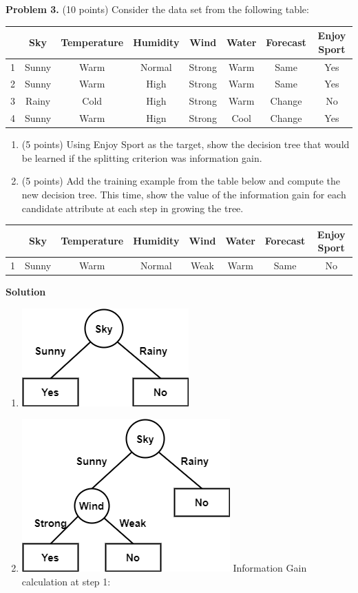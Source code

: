 \documentclass[twoside]{article}
\begin{document}

\textbf{Problem 3.} (10 points) Consider the data set from the following table:

\begin{tabular}{|c|c|c|c|c|c|c|c|}
\hline 
 & Sky & Temperature & Humidity & Wind & Water & Forecast & Enjoy Sport\tabularnewline
\hline 
\hline 
1 & Sunny & Warm & Normal & Strong & Warm & Same & Yes\tabularnewline
\hline 
2 & Sunny & Warm & High & Strong & Warm & Same & Yes\tabularnewline
\hline 
3 & Rainy & Cold & High & Strong & Warm & Change & No\tabularnewline
\hline 
4 & Sunny & Warm & Hign & Strong & Cool & Change & Yes\tabularnewline
\hline 
\end{tabular}

\begin{enumerate}
\item (5 points) Using Enjoy Sport as the target, show the decision tree that would be learned if the splitting criterion was information gain.
\item (5 points) Add the training example from the table below and compute the new decision tree. This time, show the value of the information gain for each candidate attribute at each step in growing the tree.
\end{enumerate}

\begin{tabular}{|c|c|c|c|c|c|c|c|}
\hline 
 & Sky & Temperature & Humidity & Wind & Water & Forecast & Enjoy Sport\tabularnewline
\hline 
\hline 
1 & Sunny & Warm & Normal & Weak & Warm & Same & No\tabularnewline
\hline 
\end{tabular}

\vspace{1em}

\textbf{Solution}
\begin{enumerate}
	\item 
	
	\includegraphics[scale=0.5]{3a.png}
	
	\item
	
	\includegraphics[scale=0.5]{3b.png}
	Information Gain calculation at step 1:\\
\end{enumerate}
\end{document}
